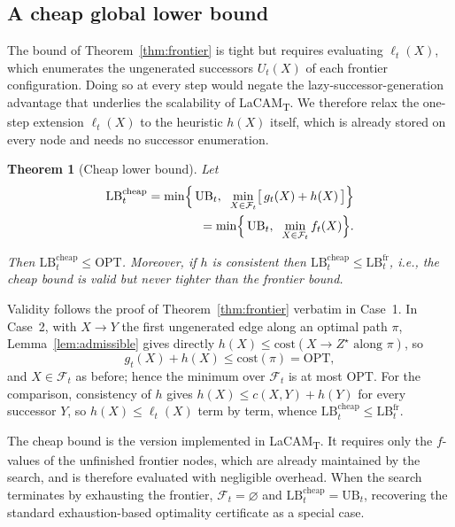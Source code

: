\documentclass[lettersize,journal]{IEEEtran}
\makeatletter
\newtheorem{theorem}{\textbf{Theorem}}
\renewenvironment{proof}[1][\proofname]{\par
  \pushQED{\qed}%
  \normalfont \topsep6\p@\@plus6\p@\relax
  \trivlist
  \item[\hskip\parindent
        \itshape
    #1\@addpunct{.}]\ignorespaces
}{%
  \popQED\endtrivlist\@endparpenalty\z@
}
\makeatother
\begin{document}
\subsection{A cheap global lower bound}
\label{subsec:lb_cheap}

The bound of Theorem~\ref{thm:frontier} is tight but requires evaluating $\ell_t(X)$, which enumerates the ungenerated successors $U_t(X)$ of each frontier configuration. Doing so at every step would negate the lazy-successor-generation advantage that underlies the scalability of LaCAM\textsubscript{T}. We therefore relax the one-step extension $\ell_t(X)$ to the heuristic $h(X)$ itself, which is already stored on every node and needs no successor enumeration.

\begin{theorem}[Cheap lower bound]
\label{thm:cheap}
Let
\begin{align}
	\mathrm{LB}_t^{\mathrm{cheap}}
	=\min\Bigl\{\,\mathrm{UB}_t,\;\;
	\min_{X\in\mathcal{F}_t}\bigl[\,g_t(X)+h(X)\,\bigr]\Bigr\}\\
	=\min\Bigl\{\,\mathrm{UB}_t,\;\;\min_{X\in\mathcal{F}_t} f_t(X)\Bigr\}.
\end{align}

Then $\mathrm{LB}_t^{\mathrm{cheap}}\le \mathrm{OPT}$. Moreover, if $h$ is consistent then $\mathrm{LB}_t^{\mathrm{cheap}}\le \mathrm{LB}_t^{\mathrm{fr}}$, i.e., the cheap bound is valid but never tighter than the frontier bound.
\end{theorem}
\begin{proof}
Validity follows the proof of Theorem~\ref{thm:frontier} verbatim in Case~1. In Case~2, with $X\to Y$ the first ungenerated edge along an optimal path $\pi$, Lemma~\ref{lem:admissible} gives directly $h(X)\le \mathrm{cost}(X\to Z^\star\text{ along }\pi)$, so
\[
g_t(X)+h(X)\le \mathrm{cost}(\pi)=\mathrm{OPT},
\]
and $X\in\mathcal{F}_t$ as before; hence the minimum over $\mathcal{F}_t$ is at most $\mathrm{OPT}$. For the comparison, consistency of $h$ gives $h(X)\le c(X,Y)+h(Y)$ for every successor $Y$, so $h(X)\le \ell_t(X)$ term by term, whence $\mathrm{LB}_t^{\mathrm{cheap}}\le \mathrm{LB}_t^{\mathrm{fr}}$.
\end{proof}

The cheap bound is the version implemented in LaCAM\textsubscript{T}. It requires only the $f$-values of the unfinished frontier nodes, which are already maintained by the search, and is therefore evaluated with negligible overhead. When the search terminates by exhausting the frontier, $\mathcal{F}_t=\varnothing$ and $\mathrm{LB}_t^{\mathrm{cheap}}=\mathrm{UB}_t$, recovering the standard exhaustion-based optimality certificate as a special case.
\end{document}
